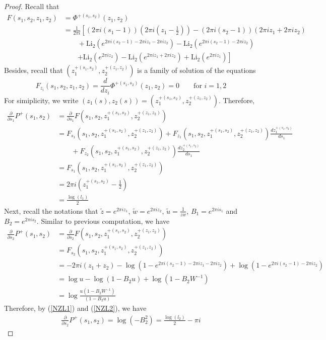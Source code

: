 \documentclass[10pt,a4paper]{article}
\newcommand{\lt}{\left}
\newcommand{\rt}{\right}
\def \Li{\operatorname{Li_2}}
\begin{document}
\begin{proof}
Recall that 
\begin{align*}
F(s_1,s_2,z_1,z_2)
&= \Phi^{+(s_1, s_2)} (z_1,z_2) \\
&=  \frac{1}{2\pi i} \lt[  \lt(2\pi i \lt( s_1 - 1\rt)\rt) \lt(2\pi i \lt(z_1 -\frac{1}{2} \rt)\rt) - (2\pi i (s_2-1))(2\pi i z_1 + 2\pi i z_2)    \rt.  \\
&\qquad + \Li\lt(e^{2\pi i (s_2-1) - 2\pi i z_1 - 2\pi i z_2}\rt) - \Li\lt( e^{2\pi i (s_2-1) - 2\pi i z_2 }\rt) \\
&\qquad \lt.+ \Li \lt(e^{2\pi i z_2}\rt) - \Li\lt(e^{2\pi iz_1+ 2\pi i z_2}\rt) + \Li\lt(e^{2\pi i z_1}\rt)\rt]
\end{align*}
Besides, recall that $(z_1^{+(s_1,s_2)},z_2^{+(z_1,z_2)})$ is a family of solution of the equations 
$$ F_{z_i}(s_1,s_2,z_1,z_2) = \frac{d}{dz_i} \Phi^{+(s_1, s_2)} (z_1,z_2) =0 \qquad \text{for $i=1,2$}$$
For simiplicity, we write $(z_1(s),z_2(s)) = (z_1^{+(s_1,s_2)},z_2^{+(z_1,z_2)})$. 
Therefore,
\begin{align*}
\frac{\partial}{\partial s_1} P^+(s_1,s_2)
&= \frac{\partial}{\partial s_1} F(s_1,s_2,z_1^{+(s_1,s_2)},z_2^{+(z_1,z_2)}) \\
&= F_{s_1}(s_1,s_2,z_1^{+(s_1,s_2)},z_2^{+(z_1,z_2)}) 
+ F_{z_1}(s_1,s_2,z_1^{+(s_1,s_2)},z_2^{+(z_1,z_2)}) \frac{d z_1^{+(s_1,s_2)}}{ds_1} \\
&\qquad + F_{z_2}(s_1,s_2,z_1^{+(s_1,s_2)},z_2^{+(z_1,z_2)}) \frac{d z_2^{+(s_1,s_2)}}{ds_1} \\
&= F_{s_1}(s_1,s_2,z_1^{+(s_1,s_2)},z_2^{+(z_1,z_2)}) \\
&= 2\pi i\lt(z_1^{+(s_1,s_2)} - \frac{1}{2}\rt) \\
&= \frac{\log( l_1)}{2} 
\end{align*}
Next, recall the notations that $\tilde z=e^{2\pi i z_1}$, $\tilde w=e^{2\pi i z_2}$, $\tilde u = \frac{1}{zw}$, $B_1 = e^{2\pi i s_1}$ and $B_2 = e^{2\pi i s_2}$. Similar to previous computation, we have
\begin{align*}
\frac{\partial}{\partial s_2} P^+(s_1,s_2)
&= \frac{\partial}{\partial s_2} F(s_1,s_2,z_1^{+(s_1,s_2)},z_2^{+(z_1,z_2)}) \\
&= F_{s_2}(s_1,s_2,z_1^{+(s_1,s_2)},z_2^{+(z_1,z_2)}) \\
&= -2\pi i(z_1+z_2) -\log(1-e^{2\pi i (s_2-1) - 2\pi i z_1 - 2\pi i z_2}) + \log(1-e^{2\pi i (s_2-1) - 2\pi i z_2}) \\
&= \log u - \log (1- B_2 u) + \log(1-B_2 W^{-1}) \\
&= \log \frac{u(1-B_2 W^{-1})}{(1- B_2 u)}
\end{align*}
Therefore, by (\ref{NZL1}) and (\ref{NZL2}), we have
\begin{align*}
\frac{\partial}{\partial s_2} P^+(s_1,s_2)
= \log (-B_2^2) = \frac{\log (l_2)}{2} - \pi i
\end{align*}
\end{proof}
\end{document}
